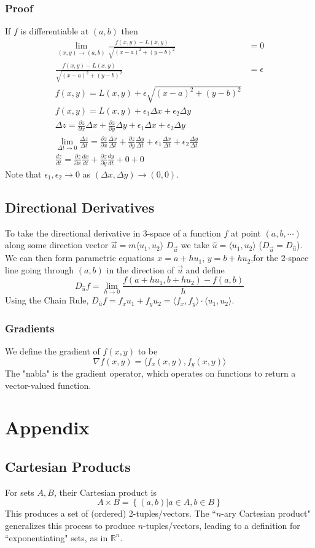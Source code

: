\documentclass{article}
\newcommand{\vect}[1]{\ensuremath{\overrightarrow{#1}}}
\begin{document}
\subsubsection{Proof}
If $f$ is differentiable at $(a,b)$ then
\begin{align*}
    \lim_{(x,y)\to(a,b)} \frac{f(x,y)-L(x,y)}{\sqrt{(x-a)^2+(y-b)^2}}&=0\\
    \frac{f(x,y)-L(x,y)}{\sqrt{(x-a)^2+(y-b)^2}}&=\epsilon\\
    f(x,y) = L(x,y) + \epsilon\sqrt{(x-a)^2+(y-b)^2}\\
    f(x,y) = L(x,y) + \epsilon_1\Delta{x} + \epsilon_2\Delta{y} \\
    \Delta{z} = \frac{\partial{z}}{\partial{x}}\Delta{x} + \frac{\partial{z}}{\partial{y}}\Delta{y} + \epsilon_1\Delta{x} + \epsilon_2\Delta{y}\\
    \lim_{\Delta{t}\to0} \frac{\Delta{z}}{\Delta{t}} = \frac{\partial{z}}{\partial{x}}\frac{\Delta{x}}{\Delta{t}} + \frac{\partial{z}}{\partial{y}}\frac{\Delta{y}}{\Delta{t}} + \epsilon_1\frac{\Delta{x}}{\Delta{t}} + \epsilon_2\frac{\Delta{y}}{\Delta{t}}\\
    \frac{dz}{dt}=\frac{\partial z}{\partial x}\frac{dx}{dt}+\frac{\partial z}{\partial y}\frac{dy}{dt}+0+0
\end{align*}
Note that $\epsilon_1, \epsilon_2\to0$ as $(\Delta{x},\Delta{y})\to(0,0)$.

\subsection{Directional Derivatives}
To take the directional derivative in 3-space of a function $f$ at point $(a,b,\cdots)$ along some direction vector $\vect{u}=m\langle u_1, u_2\rangle$ $D_{\vect{u}}$ we take $\hat{u}=\langle u_1, u_2\rangle$ ($D_{\vect{u}} = D_{\hat{u}}$). We can then form parametric equations $x=a+hu_1$, $y=b+hu_2$,for the 2-space line going through $(a,b)$ in the direction of \vect{u} and define
$$D_{\hat{u}}f=\lim_{h\to0}\frac{f(a+hu_1,b+hu_2)-f(a,b)}{h}$$
Using the Chain Rule, $D_{\hat{u}}f = f_xu_1+f_yu_2=\langle f_x, f_y \rangle \cdot \langle u_1, u_2 \rangle$.

\subsubsection{Gradients}
We define the gradient of $f(x,y)$ to be
$$\nabla f(x,y) = \langle f_x(x,y), f_y(x,y) \rangle$$
The "nabla" is the gradient operator, which operates on functions to return a vector-valued function.

\section{Appendix}
\subsection{Cartesian Products} \label{set-multiplication}
For sets $A, B$, their Cartesian product is $$A \times B = \left\{ (a,b) | a \in A, b \in B\right\}$$
This produces a set of (ordered) 2-tuples/vectors.
The ``$n$-ary Cartesian product" generalizes this process to produce $n$-tuples/vectors, leading to a definition for ``exponentiating" sets, as in $\mathbb{R}^n$.
\end{document}
